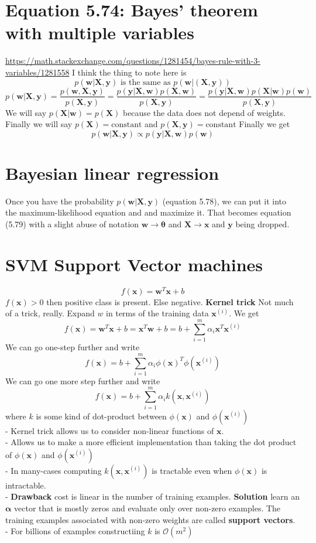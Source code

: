 \documentclass{article}
\newcommand{\beq}{\begin{equation}}
\newcommand{\eeq}{\end{equation}}
\begin{document}
\section{Equation 5.74: Bayes' theorem with multiple variables}
\url{https://math.stackexchange.com/questions/1281454/bayes-rule-with-3-variables/1281558}
I think the thing to note here is
\beq
p(\pmb{w}|\pmb{X},\pmb{y}) \text { is the same as }   p(\pmb{w}|(\pmb{X},\pmb{y})) 
\eeq
\beq
p(\pmb{w}|\pmb{X},\pmb{y}) = \frac{p(\pmb{w},\pmb{X},\pmb{y})}{p(\pmb{X},\pmb{y})} = \frac{p(\pmb{y}|\pmb{X},\pmb{w})p(\pmb{X},\pmb{w})}{p(\pmb{X},\pmb{y})}
=\frac{p(\pmb{y}|\pmb{X},\pmb{w})p(\pmb{X}|\pmb{w})p(\pmb{w})}{p(\pmb{X},\pmb{y})}
\eeq
We will say $p(\pmb{X}|\pmb{w})=p(\pmb{X})$ because the data does not depend of weights. Finally we will say $p(\pmb{X})=\text{constant}$ and $p(\pmb{X},\pmb{y})=\text{constant}$
Finally we get
\beq
p(\pmb{w}|\pmb{X},\pmb{y}) \propto  p(\pmb{y}|\pmb{X},\pmb{w})p(\pmb{w})
\eeq
\section{Bayesian linear regression}
Once you have the probability $p(\pmb{w}|\pmb{X},\pmb{y})$ (equation 5.78), we can put it into the maximum-likelihood equation and and maximize it. That becomes equation (5.79) with a slight abuse of notation $\pmb{w}\rightarrow{\pmb{\theta}}$ and $\pmb{X}\rightarrow{\pmb{x}}$ and $\pmb{y}$ being dropped.
\section{SVM Support Vector machines}
\beq
f(\pmb{x}) = \pmb{w}^T\pmb{x} + b 
\eeq
$f(\pmb{x})>0$ then positive class is present. Else negative.
\textbf{Kernel trick}
Not much of a trick, really. Expand $w$ in terms of the training data $\pmb{x}^{(i)}$. We get
\beq
f(\pmb{x})=\pmb{w}^T\pmb{x} + b = \pmb{x}^T\pmb{w} + b = b + \sum_{i=1}^m\alpha_{i}\pmb{x}^T\pmb{x}^{(i)}
\eeq
We can go one-step further and write
\beq
f(\pmb{x}) = b + \sum_{i=1}^m\alpha_{i}\phi(\pmb{x})^T\phi(\pmb{x}^{(i)})
\eeq
We can go one more step further and write
\beq
f(\pmb{x}) = b + \sum_{i=1}^m\alpha_{i}k(\pmb{x},\pmb{x}^{(i)})
\eeq
where $k$ is some kind of dot-product between $\phi(\pmb{x})$ and $\phi(\pmb{x}^{(i)})$\\
- Kernel trick allows us to consider non-linear functions of $\pmb{x}$.\\
- Allows us to make a more efficient implementation than taking the dot product of $\phi(\pmb{x})$ and $\phi(\pmb{x}^{(i)})$\\
- In many-cases computing $k(\pmb{x},\pmb{x}^{(i)})$ is tractable even when $\phi(\pmb{x})$ is intractable.\\
- \textbf{Drawback} cost is linear in the number of training examples. \textbf{Solution} learn an $\pmb{\alpha}$ vector that is mostly zeros and evaluate only over non-zero examples. The training examples associated with non-zero weights are called \textbf{support vectors}.\\
- For billions of examples constructiing $k$ is $\mathcal{O}(m^2)$
\end{document}
